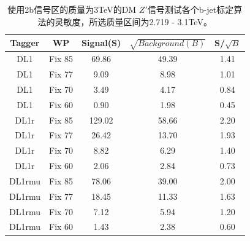 \begin{table}[ht]
	\begin{center}
		\begin{tabular}{|c|c|c|c|c|}\hline
			Tagger       & WP          & Signal(S)    & $\sqrt{Background(B)}$    & S/$\sqrt{B}$ \\
			\hline
			DL1          & Fix 85      & 69.86     & 49.39        & 1.41        \\
			DL1          & Fix 77      & 9.09      & 8.98         & 1.01        \\
			DL1          & Fix 70      & 3.49      & 4.17         & 0.84        \\
			DL1          & Fix 60      & 0.90      & 1.98         & 0.45        \\
			\hline
			DL1r          & Fix 85      & 129.02     & 58.66       & 2.20        \\
			DL1r          & Fix 77      & 26.42      & 13.70       & 1.93        \\
			DL1r          & Fix 70      & 8.82       & 6.29        & 1.40        \\
			DL1r          & Fix 60      & 2.06       & 2.84        & 0.73        \\
			\hline
			DL1rmu          & Fix 85      & 78.06     & 39.00       & 2.00        \\
			DL1rmu          & Fix 77      & 18.45     & 11.33       & 1.63        \\
			DL1rmu          & Fix 70      & 7.12      & 5.94        & 1.20        \\
			DL1rmu          & Fix 60      & 1.43      & 2.38        & 0.60        \\
			\hline
		\end{tabular}
	\end{center}
	\caption{使用2b信号区的质量为3TeV的DM $Z\prime$信号测试各个b-jet标定算法的灵敏度，所选质量区间为2.719 - 3.1TeV。}
	\label{tab:SenZ3TeV}
\end{table}

